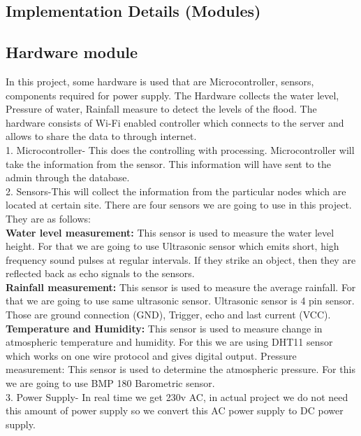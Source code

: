 \documentclass[a4paper,12pt]{report}
\begin{document}
\begin{itemize}
\section{Implementation Details (Modules)}
\subsection{Hardware module }
In this project, some hardware is used that are Microcontroller, sensors, components required for power supply. The Hardware collects the water level, Pressure of water, Rainfall measure to detect the levels of the flood. The hardware consists of Wi-Fi enabled controller which connects to the server and allows to share the data to through internet. \\
1. Microcontroller- This does the controlling with processing. Microcontroller will take the information from the sensor. This information will have sent to the admin through the database. \\
2. Sensors-This will collect the information from the particular nodes which are located at certain site. There are four sensors we are going to use in this project. \\
They are as follows: \\
\textbf{Water level measurement:} This sensor is used to measure the water level height. For that we are going to use Ultrasonic sensor which emits short, high frequency sound pulses at regular intervals. If they strike an object, then they are reflected back as echo signals to the sensors. \\
\textbf{Rainfall measurement:} This sensor is used to measure the average rainfall. For that we are going to use same ultrasonic sensor. Ultrasonic sensor is 4 pin sensor. Those are ground connection (GND), Trigger, echo and last current (VCC). \\
\textbf{Temperature and Humidity:} This sensor is used to measure change in atmospheric temperature and humidity. For this we are using DHT11 sensor which works on one wire protocol and gives digital output. Pressure measurement: This sensor is used to determine the atmospheric pressure. For this we are going to use BMP 180 Barometric sensor. \\
3. Power Supply- In real time we get 230v AC, in actual project we do not need this amount of power supply so we convert this AC power supply to DC power supply. \\

\end{itemize}
\end{document}
